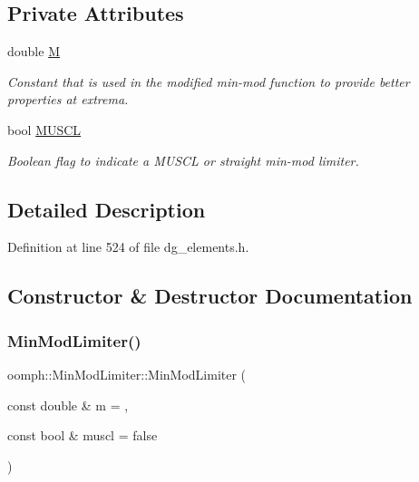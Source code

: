 \subsection*{Private Attributes}
\begin{DoxyCompactItemize}
\item 
double \hyperlink{classoomph_1_1MinModLimiter_afd69a0c54eda8f4489c578faf51156bc}{M}
\begin{DoxyCompactList}\small\item\em Constant that is used in the modified min-\/mod function to provide better properties at extrema. \end{DoxyCompactList}\item 
bool \hyperlink{classoomph_1_1MinModLimiter_a44288d5262b23de81e093bdb62b1a889}{M\+U\+S\+CL}
\begin{DoxyCompactList}\small\item\em Boolean flag to indicate a M\+U\+S\+CL or straight min-\/mod limiter. \end{DoxyCompactList}\end{DoxyCompactItemize}


\subsection{Detailed Description}


Definition at line 524 of file dg\+\_\+elements.\+h.



\subsection{Constructor \& Destructor Documentation}
\mbox{\label{classoomph_1_1MinModLimiter_a77bf95978408ce37d0da72d6c096a762}} 
\subsubsection{\texorpdfstring{Min\+Mod\+Limiter()}{MinModLimiter()}}
{\footnotesize\ttfamily oomph\+::\+Min\+Mod\+Limiter\+::\+Min\+Mod\+Limiter (\begin{DoxyParamCaption}\item[{const double \&}]{m = {},  }\item[{const bool \&}]{muscl = {\ttfamily false} }\end{DoxyParamCaption})\hspace{0.3cm}{\ttfamily [inline]}}



